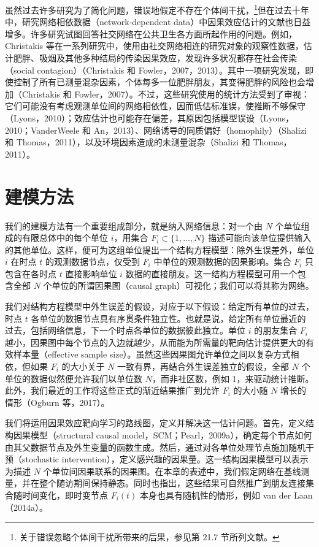 虽然过去许多研究为了简化问题，错误地假定不存在个体间干扰，\footnote{关于错误忽略个体间干扰所带来的后果，参见第 21.7 节所列文献。}但在过去十年中，研究网络相依数据（network-dependent data）中因果效应估计的文献也日益增多。许多研究试图回答社交网络在公共卫生各方面所起作用的问题。例如，Christakis 等在一系列研究中，使用由社交网络相连的研究对象的观察性数据，估计肥胖、吸烟及其他多种结局的传染因果效应，发现许多状况都存在社会传染（social contagion）（Christakis 和 Fowler，2007，2013）。其中一项研究发现，即使控制了所有已测量混杂因素，个体每多一位肥胖朋友，其变得肥胖的风险也会增加（Christakis 和 Fowler，2007）。不过，这些研究使用的统计方法受到了审视：它们可能没有考虑观测单位间的网络相依性，因而低估标准误，使推断不够保守（Lyons，2010）；效应估计也可能存在偏差，其原因包括模型误设（Lyons，2010；VanderWeele 和 An，2013）、网络诱导的同质偏好（homophily）（Shalizi 和 Thomas，2011），以及环境因素造成的未测量混杂（Shalizi 和 Thomas，2011）。

\section{建模方法}

我们的建模方法有一个重要组成部分，就是纳入网络信息：对一个由 $N$ 个单位组成的有限总体中的每个单位 $i$，用集合 $F_i\subset\{1,\ldots,N\}$ 描述可能向该单位提供输入的其他单位。这样，便可为这组单位提出一个结构方程模型：除外生误差外，单位 $i$ 在时点 $t$ 的观测数据节点，仅受到 $F_i$ 中单位的观测数据的因果影响。集合 $F_i$ 只包含在各时点 $t$ 直接影响单位 $i$ 数据的直接朋友。这一结构方程模型可用一个包含全部 $N$ 个单位的所谓因果图（causal graph）可视化；我们可以将其称为网络。

我们对结构方程模型中外生误差的假设，对应于以下假设：给定所有单位的过去，时点 $t$ 各单位的数据节点具有序贯条件独立性。也就是说，给定所有单位最近的过去，包括网络信息，下一个时点各单位的数据彼此独立。单位 $i$ 的朋友集合 $F_i$ 越小，因果图中每个节点的入边就越少，从而能为所需量的靶向估计提供更大的有效样本量（effective sample size）。虽然这些因果图允许单位之间以复杂方式相依，但如果 $F_i$ 的大小关于 $N$ 一致有界，再结合外生误差独立的假设，全部 $N$ 个单位的数据似然便允许我们以单位数 $N$，而非社区数，例如 1，来驱动统计推断。此外，我们最近的工作将这些正式的渐近结果推广到允许 $F_i$ 的大小随 $N$ 增长的情形（Ogburn 等，2017）。

我们将运用因果效应靶向学习的路线图，定义并解决这一估计问题。首先，定义结构因果模型（structural causal model，SCM；Pearl，2009a），确定每个节点如何由其父数据节点及外生变量的函数生成。然后，通过对各单位处理节点施加随机干预（stochastic intervention），定义感兴趣的因果量。这一结构因果模型可以表示为描述 $N$ 个单位间因果联系的因果图。在本章的表述中，我们假定网络在基线测量，并在整个随访期间保持静态。同时也指出，这些结果可自然推广到朋友连接集合随时间变化，即时变节点 $F_i(t)$ 本身也具有随机性的情形，例如 van der Laan（2014a）。

